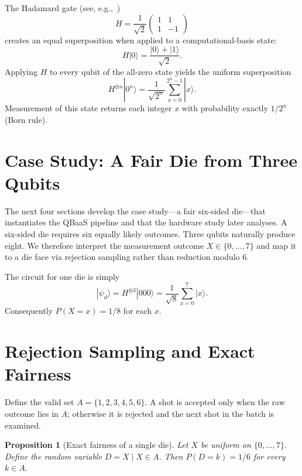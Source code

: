 \documentclass{ieeeaccess}
\newtheorem{proposition}{Proposition}
\begin{document}
The Hadamard gate (see, e.g.,~\cite{nielsen2010quantum})
\begin{equation}
H = \frac{1}{\sqrt{2}}\begin{pmatrix}1 & 1\\1 & -1\end{pmatrix}
\end{equation}
creates an equal superposition when applied to a computational-basis state:
\begin{equation}
H|0\rangle = \frac{|0\rangle+|1\rangle}{\sqrt{2}}.
\end{equation}
Applying $H$ to every qubit of the all-zero state yields the uniform superposition
\begin{equation}
H^{\otimes n}|0^n\rangle = \frac{1}{\sqrt{2^n}}\sum_{x=0}^{2^n-1}|x\rangle.
\end{equation}
Measurement of this state returns each integer $x$ with probability exactly $1/2^n$ (Born rule).

\section{Case Study: A Fair Die from Three Qubits}
\label{sec:single}

The next four sections develop the case study---a fair six-sided die---that instantiates the QBaaS pipeline and that the hardware study later analyses. A six-sided die requires six equally likely outcomes. Three qubits naturally produce eight. We therefore interpret the measurement outcome $X\in\{0,\dots,7\}$ and map it to a die face via rejection sampling rather than reduction modulo 6.

The circuit for one die is simply
\begin{equation}
|\psi_d\rangle = H^{\otimes 3}|000\rangle = \frac{1}{\sqrt{8}}\sum_{x=0}^{7}|x\rangle.
\end{equation}
Consequently $P(X=x)=1/8$ for each $x$.

\section{Rejection Sampling and Exact Fairness}
\label{sec:rejection}

Define the valid set $A=\{1,2,3,4,5,6\}$. A shot is accepted only when the raw outcome lies in $A$; otherwise it is rejected and the next shot in the batch is examined.

\begin{proposition}[Exact fairness of a single die]\label{prop:single}
Let $X$ be uniform on $\{0,\dots,7\}$. Define the random variable $D=X\mid X\in A$. Then $P(D=k)=1/6$ for every $k\in A$.
\end{proposition}
\end{document}
